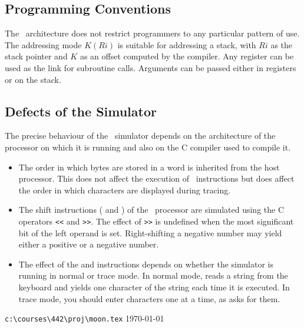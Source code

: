 \subsection{Programming Conventions}

The \moon\ architecture does not restrict programmers to any particular
pattern of use. The addressing mode $K(Ri)$ is suitable for addressing a
stack, with $Ri$ as the stack pointer and $K$ as an offset computed by
the compiler. Any register can be used as the link for subroutine calls.
Arguments can be passed either in registers or on the stack.

\subsection{Defects of the Simulator}

The precise behaviour of the \moon\ simulator depends on the
architecture of the processor on which it is running and also on the C
compiler used to compile it.

\begin{itemize}

\item The order in which bytes are stored in a word is inherited from
      the host processor. This does not affect the execution of \moon\
      instructions but does affect the order in which characters are
      displayed during tracing.

\item The shift instructions ( and ) of the \moon\
      processor are simulated using the C operators \verb"<<" and
      \verb">>". The effect of \verb">>" is undefined when the most
      significant bit of the left operand is set. Right-shifting a
      negative number may yield either a positive or a negative number.

\item The effect of the \kw{putc} and  instructions depends on
      whether the simulator is running in normal or trace mode. In
      normal mode,  reads a string from the keyboard and yields
      one character of the string each time it is executed. In trace
      mode, you should enter characters one at a time, as \kw{getc} asks
      for them.

\end{itemize}

\vfill\hfill{\scriptsize\verb"c:\courses\442\proj\moon.tex" \today}
